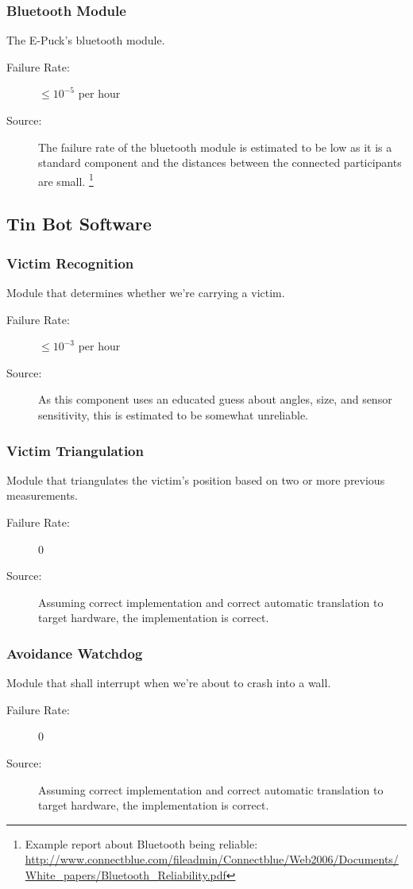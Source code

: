 \documentclass[a4paper,parskip,headheight=38pt]{scrartcl} %
\begin{document}
\subsubsection{Bluetooth Module}
The E-Puck's bluetooth module.
\begin{description}
	\item[Failure Rate:] $\leq 10^{-5}$ per hour
	\item[Source:] The failure rate of the bluetooth module is estimated to be low as it is a standard component and the distances between the connected participants are small.
    \footnote{Example report about Bluetooth being reliable:
    \url{http://www.connectblue.com/fileadmin/Connectblue/Web2006/Documents/White\_papers/Bluetooth\_Reliability.pdf}}
\end{description}

\subsection{Tin Bot Software} %

\subsubsection{Victim Recognition}
Module that determines whether we're carrying a victim.
\begin{description}
\item[Failure Rate:] $\leq 10^{-3}$ per hour
\item[Source:] As this component uses an educated guess about angles,
size, and sensor sensitivity, this is estimated to be somewhat
unreliable.
\end{description}

\subsubsection{Victim Triangulation}
Module that triangulates the victim's position based on two or more
previous measurements.
\begin{description}
\item[Failure Rate:] 0
\item[Source:] Assuming correct implementation and correct automatic translation
to target hardware, the implementation is correct.
\end{description}

\subsubsection{Avoidance Watchdog}
Module that shall interrupt when we're about to crash into a wall.
\begin{description}
\item[Failure Rate:] 0
\item[Source:] Assuming correct implementation and correct automatic translation
to target hardware, the implementation is correct.
\end{description}
\end{document}
